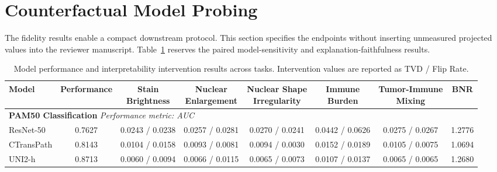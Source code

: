 \section{Counterfactual Model Probing}
\label{sec:probing}

The fidelity results enable a compact downstream protocol. This section specifies the endpoints without inserting unmeasured projected values into the reviewer manuscript. Table~\ref{tab:xai_all_tasks} reserves the paired model-sensitivity and explanation-faithfulness results.

\begin{table}[t]
\centering
\caption{Model performance and interpretability intervention results across tasks.
Intervention values are reported as TVD / Flip Rate.}
\label{tab:xai_all_tasks}

\small
\renewcommand{\arraystretch}{1.30}
\setlength{\tabcolsep}{4.5pt}

\begin{adjustbox}{max width=\textwidth}
\begin{tabular}{lccccccc}
\toprule

\textbf{Model} &
\textbf{Performance} &
\shortstack{\textbf{Stain}\\\textbf{Brightness}} &
\shortstack{\textbf{Nuclear}\\\textbf{Enlargement}} &
\shortstack{\textbf{Nuclear Shape}\\\textbf{Irregularity}} &
\shortstack{\textbf{Immune}\\\textbf{Burden}} &
\shortstack{\textbf{Tumor-Immune}\\\textbf{Mixing}} &
\textbf{BNR} \\

\midrule

\multicolumn{8}{l}{\textbf{PAM50 Classification} \hfill \textit{Performance metric: AUC}} \\
\midrule

ResNet-50
& 0.7627
& 0.0243 / 0.0238
& 0.0257 / 0.0281
& 0.0270 / 0.0241
& 0.0442 / 0.0626
& 0.0275 / 0.0267
& 1.2776 \\

CTransPath
& 0.8143
& 0.0104 / 0.0158
& 0.0093 / 0.0081
& 0.0094 / 0.0030
& 0.0152 / 0.0189
& 0.0105 / 0.0075
& 1.0694 \\

UNI2-h
& 0.8713
& 0.0060 / 0.0094
& 0.0066 / 0.0115
& 0.0065 / 0.0073
& 0.0107 / 0.0137
& 0.0065 / 0.0065
& 1.2680 \\


\end{tabular}
\end{adjustbox}
\end{table}
